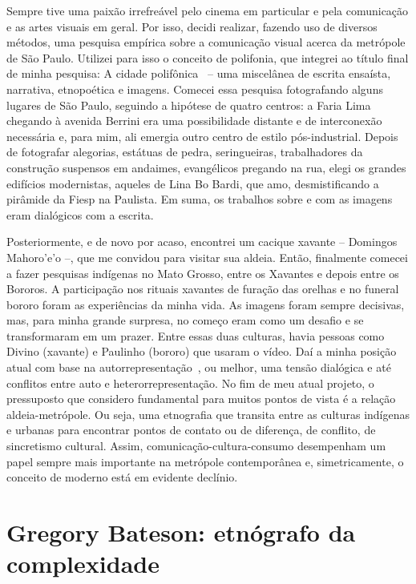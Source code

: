 \documentclass[a4paper, 12pt]{article} %
\begin{document}
Sempre tive uma paixão irrefreável pelo cinema em particular e pela comunicação e as artes visuais em geral. Por isso, decidi realizar, fazendo uso de diversos métodos, uma pesquisa empírica sobre a comunicação visual acerca da metrópole de São Paulo. Utilizei para isso o conceito de polifonia, que integrei ao título final de minha pesquisa: A cidade polifônica~\cite{b1} – uma miscelânea de escrita ensaísta, narrativa, etnopoética e imagens. Comecei essa pesquisa fotografando alguns lugares de São Paulo, seguindo a hipótese de quatro centros: a Faria Lima chegando à avenida Berrini era uma possibilidade distante e de interconexão necessária e, para mim, ali emergia outro centro de estilo pós-industrial. Depois de fotografar alegorias, estátuas de pedra, seringueiras, trabalhadores da construção suspensos em andaimes, evangélicos pregando na rua, elegi os grandes edifícios modernistas, aqueles de Lina Bo Bardi, que amo, desmistificando a pirâmide da Fiesp na Paulista. Em suma, os trabalhos sobre e com as imagens eram dialógicos com a escrita. 

Posteriormente, e de novo por acaso, encontrei um cacique xavante – Domingos Mahoro’e’o –, que me convidou para visitar sua aldeia. Então, finalmente comecei a fazer pesquisas indígenas no Mato Grosso, entre os Xavantes e depois entre os Bororos. A participação nos rituais xavantes de furação das orelhas e no funeral bororo foram as experiências da minha vida. As imagens foram sempre decisivas, mas, para minha grande surpresa, no começo eram como um desafio e se transformaram em um prazer. Entre essas duas culturas, havia pessoas como Divino (xavante) e Paulinho (bororo) que usaram o vídeo. Daí a minha posição atual com base na autorrepresentação~\cite{b2}, ou melhor, uma tensão dialógica e até conflitos entre auto e heterorrepresentação. No fim de meu atual projeto, o pressuposto que considero fundamental para muitos pontos de vista é a relação aldeia-metrópole. Ou seja, uma etnografia que transita entre as culturas indígenas e urbanas para encontrar pontos de contato ou de diferença, de conflito, de sincretismo cultural. Assim, comunicação-cultura-consumo desempenham um papel sempre mais importante na metrópole contemporânea e, simetricamente, o conceito de moderno está em evidente declínio.
\nocite{b3}


\section*{Gregory Bateson: etnógrafo da complexidade}\label{sec:bat}
\end{document}
